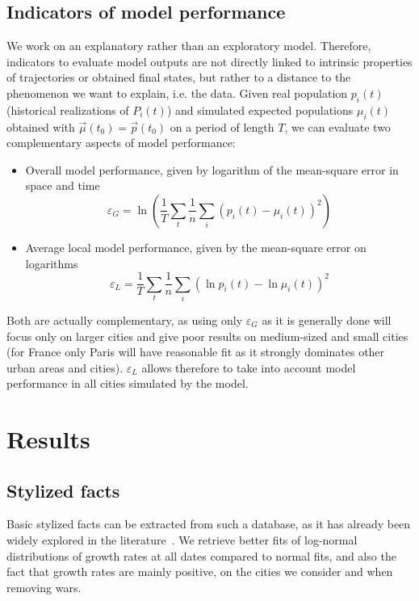 \documentclass[Royal,sageh,times]{sagej}
\begin{document}
\subsection*{Indicators of model performance}

We work on an explanatory rather than an exploratory model. Therefore, indicators to evaluate model outputs are not directly linked to intrinsic properties of trajectories or obtained final states, but rather to a distance to the phenomenon we want to explain, i.e. the data. Given real population $p_i(t)$ (historical realizations of $P_i(t)$) and simulated expected populations $\mu_i(t)$ obtained with $\vec{\mu}(t_0) = \vec{p}(t_0)$ on a period of length $T$, we can evaluate two complementary aspects of model performance:

\begin{itemize}
\item Overall model performance, given by logarithm of the mean-square error in space and time
\[
\varepsilon_G = \ln{\left(\frac{1}{T}\sum_t \frac{1}{n} \sum_i \left(p_i (t) - \mu_i (t) \right)^2\right)}
\]
\item Average local model performance, given by the mean-square error on logarithms
\[
\varepsilon_L = \frac{1}{T}\sum_t \frac{1}{n} \sum_i \left(\ln p_i(t) - \ln \mu_i (t)\right)^2
\]
\end{itemize}

Both are actually complementary, as using only $\varepsilon_G$ as it is generally done will focus only on larger cities and give poor results on medium-sized and small cities (for France only Paris will have reasonable fit as it strongly dominates other urban areas and cities). $\varepsilon_L$ allows therefore to take into account model performance in all cities simulated by the model.






\section*{Results}



\subsection*{Stylized facts}

Basic stylized facts can be extracted from such a database, as it has already been widely explored in the literature~\citep{guerin1990150}. We retrieve better fits of log-normal distributions of growth rates at all dates compared to normal fits, and also the fact that growth rates are mainly positive, on the cities we consider and when removing wars.
\end{document}
